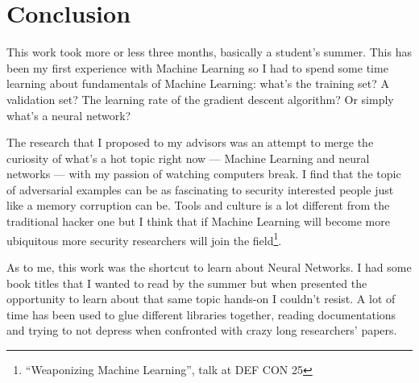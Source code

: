 \chapter*{Conclusion}

This work took more or less three months, basically a student's summer.
This has been my first experience with Machine Learning so I had to
spend some time learning about fundamentals of Machine Learning: what's
the training set? A validation set? The learning rate of the gradient
descent algorithm? Or simply what's a neural network?

The research that I proposed to my advisors was an attempt to merge the
curiosity of what's a hot topic right now --- Machine Learning and
neural networks --- with my passion of watching computers break. I find
that the topic of adversarial examples can be as fascinating to
security interested people just like a memory corruption can be. Tools
and culture is a lot different from the traditional hacker one but I
think that if Machine Learning will become more ubiquitous more
security researchers will join the field\footnote{``Weaponizing Machine
  Learning'', talk at DEF CON 25}.

As to me, this work was the shortcut to learn about Neural Networks. I
had some book titles that I wanted to read by the summer but when
presented the opportunity to learn about that same topic hands-on I
couldn't resist. A lot of time has been used to glue different
libraries together, reading documentations and trying to not depress
when confronted with crazy long researchers' papers.
